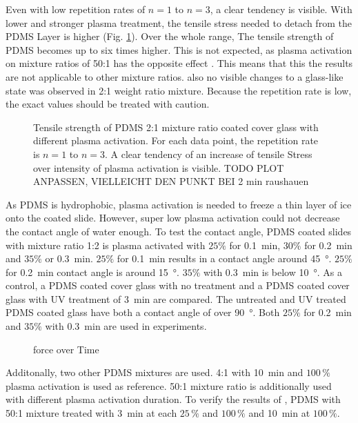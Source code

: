Even with low repetition rates of $n = 1$ to $ n =3$, a clear tendency is visible. With lower and stronger plasma treatment, the tensile stress needed to detach from the PDMS Layer is higher (Fig. \ref{fig:PlotPlasmaAktivierung}). Over the whole range, The tensile strength of PDMS becomes up to six times higher. This is not expected, as plasma activation on mixture ratios of 50:1 has the opposite effect \cite{Ohishi.2017}. This means that this the results are not applicable to other mixture ratios. also no visible changes to a glass-like state was observed in 2:1 weight ratio mixture. Because the repetition rate is low, the exact values should be treated with caution. 

\begin{figure}[hbt!]
	\centering
	
	\caption{Tensile strength of PDMS 2:1 mixture ratio coated cover glass with different plasma activation. For each data point, the repetition rate is $n = 1$ to $ n =3$. A clear tendency of an increase of tensile Stress over intensity of plasma activation is visible. TODO PLOT ANPASSEN, VIELLEICHT DEN PUNKT BEI 2 min raushauen}
	\label{fig:PlotPlasmaAktivierung}
\end{figure}

As PDMS is hydrophobic, plasma activation is needed to freeze a thin layer of ice onto the coated slide. However, super low plasma activation could not decrease the contact angle of water enough. To test the contact angle,  PDMS coated slides with mixture ratio 1:2 is plasma activated with $25\%$ for \SI{0.1}{\minute}, $30\%$ for \SI{0.2}{\minute} and $35\%$ or \SI{0.3}{\minute}. $25\%$ for \SI{0.1}{\minute} results in a contact angle around \SI{45}{\degree}. $25\%$ for \SI{0.2}{\minute} contact angle is around \SI{15}{\degree}. $35\%$ with \SI{0.3}{\minute} is below \SI{10}{\degree}. As a control, a PDMS coated cover glass with no treatment and a PDMS coated cover glass with UV treatment of \SI{3}{\minute} are compared. The untreated and UV treated PDMS coated glass have both a contact angle of over \SI{90}{\degree}. Both $25\%$ for \SI{0.2}{\minute} and $35\%$ with \SI{0.3}{\minute} are used in experiments.	

\begin{figure}[hbt!]
	\centering
	
	\caption{force over Time}
\end{figure}

Additonally, two other PDMS mixtures are used. 4:1 with \SI{10}{\minute} and $100\,\%$ plasma activation is used as reference. 50:1 mixture ratio is additionally used with different plasma activation duration. To verify the results of \cite{Ohishi.2017}, PDMS with 50:1 mixture treated with \SI{3}{\minute} at each $25\,\%$ and $100\,\%$ and \SI{10}{\minute} at $100\,\%$. 

